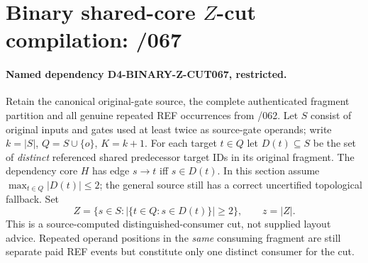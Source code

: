 \documentclass[11pt]{article}
\begin{document}
\section{Binary shared-core $Z$-cut compilation: /067}
\paragraph{Named dependency D4-BINARY-Z-CUT067, restricted.}
Retain the canonical original-gate source, the complete authenticated
fragment partition and all genuine repeated REF occurrences from /062.
Let $S$ consist of original inputs and gates used at least twice as
source-gate operands; write $k=|S|$, $Q=S\cup\{o\}$, $K=k+1$.
For each target $t\in Q$ let $D(t)\subseteq S$ be the set of
\emph{distinct} referenced shared predecessor target IDs in its
original fragment. The dependency core $H$ has edge $s\to t$ iff
$s\in D(t)$. In this section assume
$\max_{t\in Q}|D(t)|\le2$; the general source still has a correct
uncertified topological fallback. Set
\[
 Z=\{s\in S:|\{t\in Q:s\in D(t)\}|\ge2\},\qquad z=|Z|.
\]
This is a source-computed distinguished-consumer cut, not supplied
layout advice. Repeated operand positions in the \emph{same}
consuming fragment are still separate paid REF events but
constitute only one distinct consumer for the cut.
\end{document}
